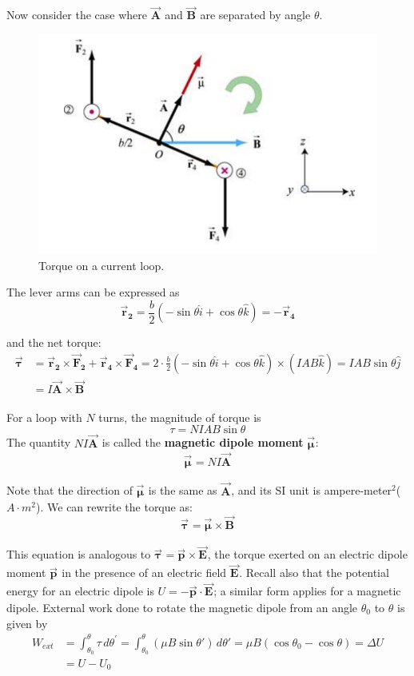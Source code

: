 \documentclass[11pt, letterpaper]{article}
\theoremstyle{definition}
\theoremstyle{remark}
\newcommand{\bv}[2][]{\bm{\vec{#2}_{#1}}}
\begin{document}
Now consider the case where $\bv{A}$ and $\bv{B}$ are separated by angle $\theta$. 
\begin{figure}[h!]
	\centering
	\includegraphics[scale=0.6]{angle}
	\caption{Torque on a current loop.}
	\label{fig:angle}
\end{figure}

The lever arms can be expressed as
\[\bv[2]{r} = \frac b2(-\sin\theta\hat{i} + \cos\theta\hat{k}) = -\bv[4]{r}\]

and the net torque:
\[
\begin{split}
	\bv{\tau} &= \bv[2]{r}\times\bv[2]{F} + \bv[4]{r}\times\bv[4]{F} 
				   = 2\cdot\frac b2(-\sin\theta\hat{i} + \cos\theta\hat{k})\times (IAB\hat{k})
				   = IAB\sin\theta\hat{j}\\
				   &= I\bv{A}\times\bv{B}
\end{split}
\]

For a loop with $N$ turns, the magnitude of torque is \[\tau = NIAB\sin\theta\]
The quantity $NI\bv{A}$ is called the \textbf{magnetic dipole moment} $\bv{\mu}$: 
\begin{equation}\label{eqn: magnetic-dipole-moment}
	\boxed{\bv{\mu} = NI\bv{A}}
\end{equation}

Note that the direction of $\bv{\mu}$ is the same as $\bv{A}$, and its SI unit is ampere-meter$^2$($A\cdot m^2$). We can rewrite the torque as: 
\begin{equation}\label{eqn: torque-dipole}
	\boxed{\bv{\tau} = \bv{\mu} \times \bv{B}}
\end{equation}

This equation is analogous to $\bv{\tau} = \bv{p}\times\bv{E}$, the torque exerted on an electric dipole moment $\bv{p}$ in the presence of an electric field $\bv{E}$. Recall also that the potential energy for an electric dipole is $U = -\bv{p}\cdot\bv{E}$; a similar form applies for a magnetic dipole. External work done to rotate the magnetic dipole from an angle $\theta_0$ to $\theta$ is given by 
\[
\begin{split}
	W_{ext} &= \int_{\theta_0}^{\theta} \tau\, d\theta ^\prime = \int_{\theta_0}^{\theta} (\mu B\sin\theta\prime)\, d\theta\prime = \mu B(\cos\theta_0 - \cos\theta) = \Delta U\\
				&= U - U_0
\end{split}
\]
\end{document}
